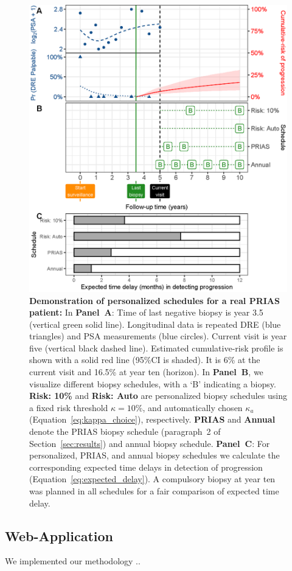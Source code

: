 \begin{figure}
\centerline{\includegraphics{images/demo_schedule.eps}}
\caption{\textbf{Demonstration of personalized schedules for a real PRIAS patient:} In \textbf{Panel~A}: Time of last negative biopsy is year 3.5 (vertical green solid line). Longitudinal data is repeated DRE (blue triangles) and PSA measurements (blue circles). Current visit is year five (vertical black dashed line). Estimated cumulative-risk profile is shown with a solid red line (95\%CI is shaded). It is 6\% at the current visit and 16.5\% at year ten (horizon). In \textbf{Panel~B}, we visualize different biopsy schedules, with a `B' indicating a biopsy. \textbf{Risk: 10\%} and \textbf{Risk: Auto} are personalized biopsy schedules using a fixed risk threshold $\kappa=10\%$, and automatically chosen $\kappa_a$ (Equation~\ref{eq:kappa_choice}), respectively. \textbf{PRIAS} and \textbf{Annual} denote the PRIAS biopsy schedule (paragraph~2 of Section~\ref{sec:results}) and annual biopsy schedule. \textbf{Panel~C}: For personalized, PRIAS, and annual biopsy schedules we calculate the corresponding expected time delays in detection of progression (Equation~\ref{eq:expected_delay}). A compulsory biopsy at year ten was planned in all schedules for a fair comparison of expected time delay.} 
\label{fig:demo_schedule}
\end{figure}

\subsection{Web-Application}
We implemented our methodology ..